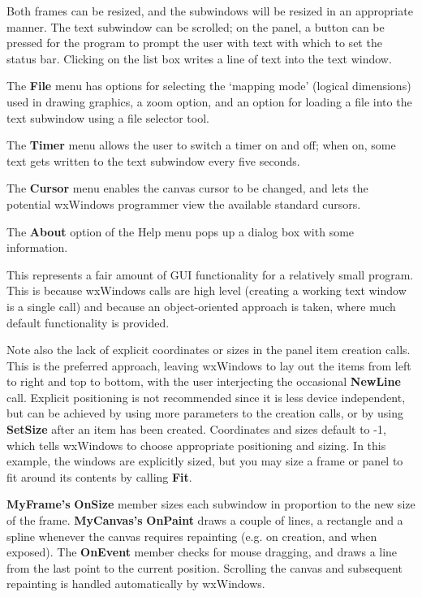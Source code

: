 Both frames can be resized, and the subwindows will be resized
in an appropriate manner. The text subwindow can be scrolled;
on the panel, a button can be pressed for the program to prompt the user
with text with which to set the status bar. Clicking on the
list box writes a line of text into the text window.

The {\bf File} menu has options for selecting the `mapping mode' (logical
dimensions) used in drawing graphics, a zoom option, and an option for
loading a file into the text subwindow using a file selector tool.

The {\bf Timer} menu allows the user to switch a timer on and off; when on,
some text gets written to the text subwindow every five seconds.

The {\bf Cursor} menu enables the canvas cursor to be changed, and lets
the potential wxWindows programmer view the available standard cursors.

The {\bf About} option of the Help menu pops up a dialog box with some
information.

This represents a fair amount of GUI functionality for a relatively
small program. This is because wxWindows calls are high level (creating
a working text window is a single call) and because an object-oriented
approach is taken, where much default functionality is provided.

Note also the lack of explicit coordinates or sizes in the panel item
creation calls. This is the preferred approach, leaving wxWindows to lay
out the items from left to right and top to bottom, with the user
interjecting the occasional {\bf NewLine} call.  Explicit positioning is
not recommended since it is less device independent, but can be achieved
by using more parameters to the creation calls, or by using {\bf
SetSize} after an item has been created.  Coordinates and sizes default
to -1, which tells wxWindows to choose appropriate positioning and
sizing.  In this example, the windows are explicitly sized, but you may
size a frame or panel to fit around its contents by calling {\bf Fit}.

{\bf MyFrame's} {\bf OnSize} member sizes each subwindow in proportion
to the new size of the frame. {\bf MyCanvas's} {\bf OnPaint} draws a
couple of lines, a rectangle and a spline whenever the canvas requires
repainting (e.g. on creation, and when exposed). The {\bf OnEvent}
member checks for mouse dragging, and draws a line from the last point
to the current position.  Scrolling the canvas and subsequent
repainting is handled automatically by wxWindows.


